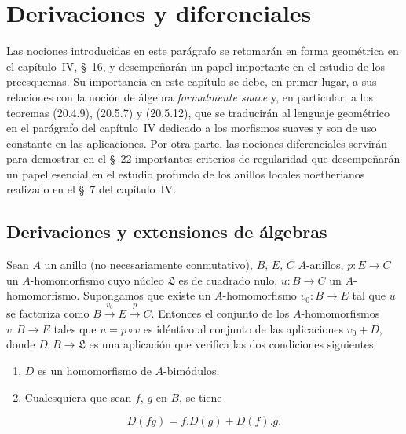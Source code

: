 \section{Derivaciones y diferenciales}
\label{section:0.20-fr}
\label{0.20-fr}

Las nociones introducidas en este parágrafo se retomarán en forma
geométrica en el capítulo~IV, §~16, y desempeñarán un papel importante en el
estudio de los preesquemas. Su importancia en este capítulo se debe, en primer
lugar, a sus relaciones con la noción de álgebra \emph{formalmente suave} y, en
particular, a los teoremas (20.4.9), (20.5.7) y (20.5.12), que se traducirán al
lenguaje geométrico en el parágrafo del capítulo~IV dedicado a los morfismos
suaves y son de uso constante en las aplicaciones. Por otra parte, las nociones
diferenciales servirán para demostrar en el §~22 importantes criterios de
regularidad que desempeñarán un papel esencial en el estudio profundo de los
anillos locales noetherianos realizado en el §~7 del capítulo~IV.


\subsection{Derivaciones y extensiones de álgebras}
\label{subsection:0.20.1-fr}


\begin{proposition}[20.1.1]
\label{0.20.1.1-fr}
Sean $A$ un anillo \textup{(no necesariamente conmutativo)}, $B$, $E$, $C$
$A$-anillos, $p:E\to C$ un $A$-homomorfismo cuyo núcleo $\mathfrak{L}$
es de cuadrado nulo, $u:B\to C$ un $A$-homomorfismo. Supongamos que existe
un $A$-homomorfismo $v_0:B\to E$ tal que $u$ se factoriza como
$B\xrightarrow{v_0}E\xrightarrow{p}C$. Entonces el conjunto de los
$A$-homomorfismos $v:B\to E$ tales que $u=p\circ v$ es idéntico al
conjunto de las aplicaciones $v_0+D$, donde $D:B\to\mathfrak{L}$ es una
aplicación que verifica las dos condiciones siguientes:
\begin{enumerate}
  \item[\rm(i)] $D$ es un homomorfismo de $A$-bimódulos.
  \item[\rm(ii)] Cualesquiera que sean $f$, $g$ en $B$, se tiene
\end{enumerate}
\begin{equation}
\tag{20.1.1.1}
\label{0.20.1.1.1-fr}
  D(fg)=f.D(g)+D(f).g.
\end{equation}
\end{proposition}

